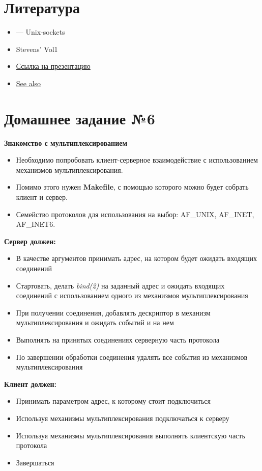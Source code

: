 \documentclass[../../lectures.tex]{subfiles}
\begin{document}
\section{Литература}
\begin{itemize}
    \item {} --- Unix-sockets
    \item Stevens' Vol1
    \item \textcolor{blue}{
        \href{http://www.telecom.otago.ac.nz/tele402/lectures/lecture3.pdf}{Ссылка на презентацию}
    }
    \item \textcolor{blue}{
        \href{https://notes.shichao.io/unp/ch4}{See also}
    }
\end{itemize}

\section{Домашнее задание №6}
\textbf{Знакомство с мультиплексированием}
\begin{itemize}
    \item Необходимо попробовать клиент-серверное взаимодействие с использованием механизмов мультиплексирования.
    \item Помимо этого нужен \textbf{Makefile}, с помощью которого можно будет собрать клиент и сервер.
    \item Семейство протоколов для использования на выбор: AF\_UNIX, AF\_INET, AF\_INET6.
\end{itemize}

\textbf{Сервер должен:}
\begin{itemize}
    \item В качестве аргументов принимать адрес, на котором будет ожидать входящих соединений
    \item Стартовать, делать \emph{bind(2)} на заданный адрес и ожидать входящих соединений с использованием одного из механизмов мультиплексирования
    \item При получении соединения, добавлять дескриптор в механизм мультиплексирования и ожидать событий и на нем
    \item Выполнять на принятых соединениях серверную часть протокола
    \item По завершении обработки соединения удалять все события из механизмов мультиплексирования
\end{itemize}

\textbf{Клиент должен:}
\begin{itemize}
    \item Принимать параметром адрес, к которому стоит подключиться
    \item Используя механизмы мультиплексирования подключаться к серверу
    \item Используя механизмы мультиплексирования выполнять клиентскую часть протокола
    \item Завершаться
\end{itemize}
\end{document}
